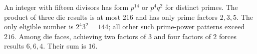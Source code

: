 An integer with fifteen divisors has form $p^{14}$ or $p^4q^2$ for distinct primes. The product of three die results is at most $216$ and has only prime factors $2,3,5$. The only eligible number is $2^4 3^2=144$; all other such prime-power patterns exceed $216$. Among die faces, achieving two factors of $3$ and four factors of $2$ forces results $6,6,4$. Their sum is $\boxed{16}$.
